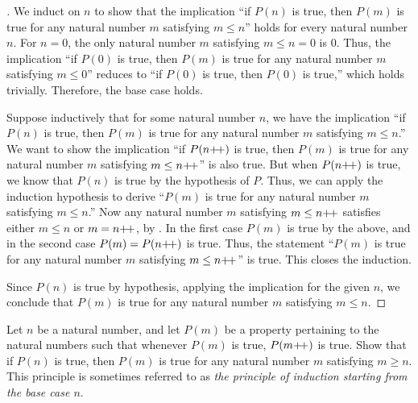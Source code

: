 \begin{proof}[]
  We induct on \(n\) to show that the implication ``if \(P(n)\) is true, then \(P(m)\) is true for any natural number \(m\) satisfying \(m \leq n\)'' holds for every natural number \(n\).
  For \(n = 0\), the only natural number \(m\) satisfying \(m \leq n = 0\) is \(0\).
  Thus, the implication ``if \(P(0)\) is true, then \(P(m)\) is true for any natural number \(m\) satisfying \(m \leq 0\)'' reduces to ``if \(P(0)\) is true, then \(P(0)\) is true,'' which holds trivially.
  Therefore, the base case holds.

  Suppose inductively that for some natural number \(n\), we have the implication ``if \(P(n)\) is true, then \(P(m)\) is true for any natural number \(m\) satisfying \(m \leq n\).''
  We want to show the implication ``if \(P(n{+}\!{+})\) is true, then \(P(m)\) is true for any natural number \(m\) satisfying \(m \leq n{+}\!{+}\)'' is also true.
  But when \(P(n{+}\!{+})\) is true, we know that \(P(n)\) is true by the hypothesis of \(P\).
  Thus, we can apply the induction hypothesis to derive ``\(P(m)\) is true for any natural number \(m\) satisfying \(m \leq n\).''
  Now any natural number \(m\) satisfying \(m \leq n{+}\!{+}\) satisfies either \(m \leq n\) or \(m = n{+}\!{+}\), by .
  In the first case \(P(m)\) is true by the above, and in the second case \(P(m) = P(n{+}\!{+})\) is true.
  Thus, the statement ``\(P(m)\) is true for any natural number \(m\) satisfying \(m \leq n{+}\!{+}\)'' is true.
  This closes the induction.

  Since \(P(n)\) is true by hypothesis, applying the implication for the given \(n\), we conclude that \(P(m)\) is true for any natural number \(m\) satisfying \(m \leq n\).
\end{proof}

\begin{ex}\label{i:ex:2.2.7}
  Let \(n\) be a natural number, and let \(P(m)\) be a property pertaining to the natural numbers such that whenever \(P(m)\) is true, \(P(m{+}\!{+})\) is true.
  Show that if \(P(n)\) is true, then \(P(m)\) is true for any natural number \(m\) satisfying \(m \geq n\).
  This principle is sometimes referred to as \emph{the principle of induction starting from the base case \(n\)}.
\end{ex}


